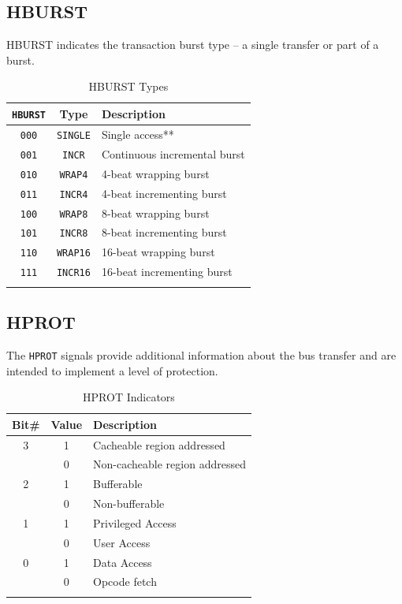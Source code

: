 \subsection{HBURST}

HBURST indicates the transaction burst type -- a single transfer or part
of a burst.

\begin{longtable}[c]{@{\extracolsep{\fill}}ccl}	
	\toprule 
	\textbf{\texttt{HBURST}} & \textbf{Type} & \textbf{Description}\\
	\midrule
	\endhead 
	\texttt{000} & \texttt{SINGLE} & Single access**\\
	\texttt{001} & \texttt{INCR}   & Continuous incremental burst\\
	\texttt{010} & \texttt{WRAP4}  & 4-beat wrapping burst\\
	\texttt{011} & \texttt{INCR4}  & 4-beat incrementing burst\\
	\texttt{100} & \texttt{WRAP8}  & 8-beat wrapping burst\\
	\texttt{101} & \texttt{INCR8}  & 8-beat incrementing burst\\
	\texttt{110} & \texttt{WRAP16} & 16-beat wrapping burst\\
	\texttt{111} & \texttt{INCR16} & 16-beat incrementing burst\\
	\bottomrule 	
	\caption{HBURST Types}
	\label{tab:HBURST}
\end{longtable}

\subsection{HPROT}

The \texttt{HPROT} signals provide additional information about the bus
transfer and are intended to implement a level of protection.

\begin{longtable}[c]{@{}ccl}	
	\toprule 
	\textbf{Bit\#} & \textbf{Value} & \textbf{Description}\\
	\midrule
	\endhead 
	3 & 1 & Cacheable region addressed\\
	& 0 & Non-cacheable region addressed\\
	2 & 1 & Bufferable\\
	& 0 & Non-bufferable\\
	1 & 1 & Privileged Access\\
	& 0 & User Access\\
	0 & 1 & Data Access\\
	& 0 & Opcode fetch\\
	\bottomrule 	
	\caption{HPROT Indicators}
	\label{tab:HPROT}
\end{longtable}


